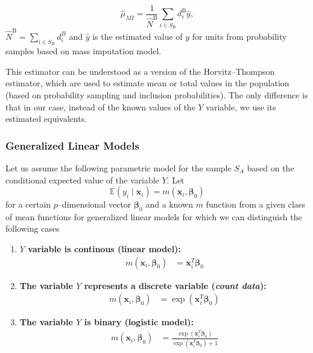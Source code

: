 \documentclass[
]{jss}
\begin{document}
\begin{equation}
\hat{\mu}_{M I}=\frac{1}{\hat{N}^{\mathrm{B}}} \sum_{i \in S_{\mathrm{B}}} d_i^{\mathrm{B}} \hat{y}, 
\end{equation} \(\hat{N}^{\mathrm{B}} = \sum_{i \in S_B} d_i^B\) and
\(\hat{y}\) is the estimated value of \(y\) for units from probability
samples based on mass imputation model.

This estimator can be understood as a version of the Horvitz--Thompson
estimator, which are used to estimate mean or total values in the
population (based on probability sampling and inclusion probabilities).
The only difference is that in our case, instead of the known values of
the \(Y\) variable, we use its estimated equivalents.

\hypertarget{generalized-linear-models}{%
\subsubsection{Generalized Linear
Models}\label{generalized-linear-models}}

Let us assume the following parametric model for the sample \(S_A\)
based on the conditional expected value of the variable \(Y\). Let
\begin{equation}
\mathbb{E}\left(y_i \mid \boldsymbol{x}_i\right)=m\left(\boldsymbol{x}_i, \boldsymbol{\beta}_0\right)
\end{equation} for a certain \(p\)--dimensional vector
\(\boldsymbol{\beta}_0\) and a known \(m\) function from a given class
of mean functions for generalized linear models for which we can
distinguish the following cases

\begin{enumerate}
    \item \textbf{\( Y \) variable is continous (linear model):}
    \begin{align*}
        m\left(\boldsymbol{x}_i, \boldsymbol{\beta}_0\right) &= \boldsymbol{x}_i^T \boldsymbol{\beta}_0
    \end{align*}

    \item \textbf{The variable \( Y \)  represents a discrete variable (\textit{count data}):}
    \begin{align*}
        m\left(\boldsymbol{x}_i, \boldsymbol{\beta}_0\right) &= \exp \left(\boldsymbol{x}_i^T \boldsymbol{\beta}_0\right)
    \end{align*}

    \item \textbf{The variable \( Y \)  is binary (logistic model):}
    \begin{align*}
        m\left(\boldsymbol{x}_i, \boldsymbol{\beta}_0\right) &= \frac{\exp \left(\boldsymbol{x}_i^T \boldsymbol{\beta}_0\right)}{\exp \left(\boldsymbol{x}_i^T \boldsymbol{\beta}_0\right) + 1}
    \end{align*}
\end{enumerate}
\end{document}
